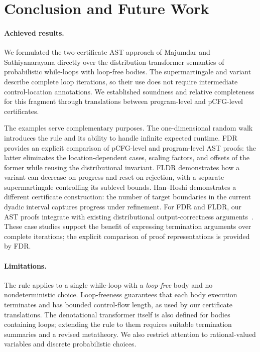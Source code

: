 \section{Conclusion and Future Work}
\label{sec:conclusion}

\paragraph{Achieved results.}
We formulated the two-certificate AST approach of Majumdar and Sathiyanarayana directly over the distribution-transformer semantics of probabilistic while-loops with loop-free bodies. The supermartingale and variant describe complete loop iterations, so their use does not require intermediate control-location annotations. We established soundness and relative completeness for this fragment through translations between program-level and pCFG-level certificates.

The examples serve complementary purposes. The one-dimensional random walk introduces the rule and its ability to handle infinite expected runtime. FDR provides an explicit comparison of pCFG-level and program-level AST proofs: the latter eliminates the location-dependent cases, scaling factors, and offsets of the former while reusing the distributional invariant. FLDR demonstrates how a variant can decrease on progress and reset on rejection, with a separate supermartingale controlling its sublevel bounds. Han--Hoshi demonstrates a different certificate construction: the number of target boundaries in the current dyadic interval captures progress under refinement. For FDR and FLDR, our AST proofs integrate with existing distributional output-correctness arguments~\cite{zilken2026verifyingsamplingalgorithmsdistributional}. These case studies support the benefit of expressing termination arguments over complete iterations; the explicit comparison of proof representations is provided by FDR.

\paragraph{Limitations.}
The rule applies to a single while-loop with a \emph{loop-free} body and no nondeterministic choice. Loop-freeness guarantees that each body execution terminates and has bounded control-flow length, as used by our certificate translations. The denotational transformer itself is also defined for bodies containing loops; extending the rule to them requires suitable termination summaries and a revised metatheory. We also restrict attention to rational-valued variables and discrete probabilistic choices.

